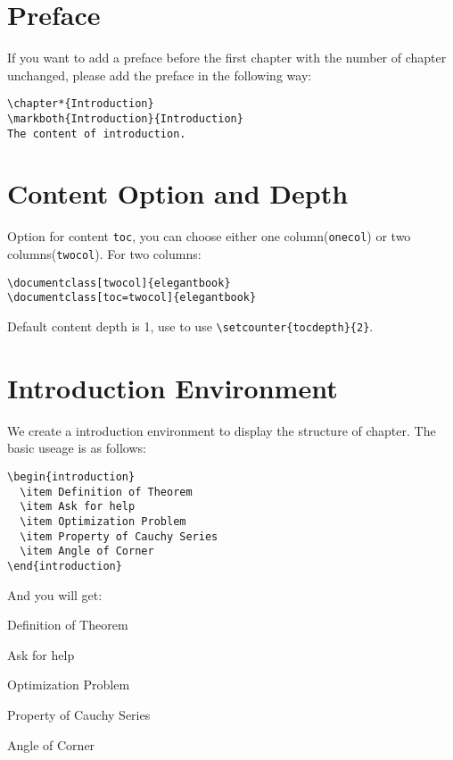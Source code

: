 \documentclass[11pt]{elegantbook}
\begin{document}
\section{Preface}

If you want to add a preface before the first chapter with the number of chapter unchanged, please add the preface in the following way:
\begin{lstlisting}
\chapter*{Introduction}
\markboth{Introduction}{Introduction}
The content of introduction.
\end{lstlisting}

\section{Content Option and Depth}
Option for content \lstinline{toc}, you can  choose either one column(\lstinline{onecol}) or two columns(\lstinline{twocol}). For two columns:
\begin{lstlisting}
\documentclass[twocol]{elegantbook}
\documentclass[toc=twocol]{elegantbook}
\end{lstlisting}

Default content depth is 1, use to use \lstinline|\setcounter{tocdepth}{2}|.

\section{Introduction Environment}
We create a introduction environment to display the structure of chapter. The basic useage is as follows:
\begin{lstlisting}
\begin{introduction}
  \item Definition of Theorem
  \item Ask for help
  \item Optimization Problem
  \item Property of Cauchy Series
  \item Angle of Corner
\end{introduction}
\end{lstlisting}
And you will get:
\begin{introduction}
  \item Definition of Theorem
  \item Ask for help
  \item Optimization Problem
  \item Property of Cauchy Series
  \item Angle of Corner
\end{introduction}
\end{document}
